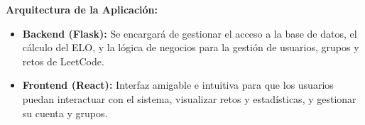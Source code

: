 \textbf{Arquitectura de la Aplicación:}
\begin{itemize}
    \item \textbf{Backend (Flask):} Se encargará de gestionar el acceso a la base de datos, el cálculo del ELO, y la lógica de negocios para la gestión de usuarios, grupos y retos de LeetCode.
    \item \textbf{Frontend (React):} Interfaz amigable e intuitiva para que los usuarios puedan interactuar con el sistema, visualizar retos y estadísticas, y gestionar su cuenta y grupos.
\end{itemize}
